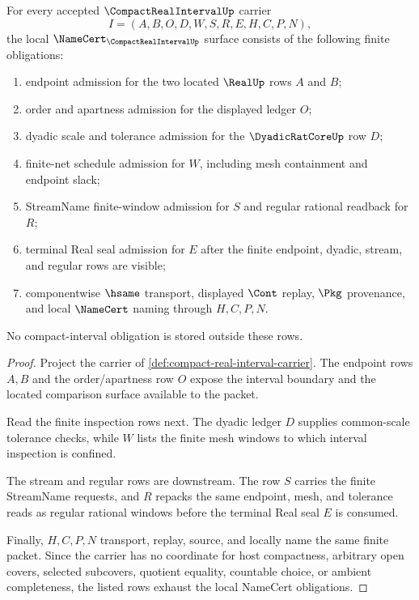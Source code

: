 \begin{theorem}
\label{thm:compact-real-interval-net-obligations}
For every accepted $\CompactRealIntervalUp$ carrier
$$
I=(A,B,O,D,W,S,R,E,H,C,P,N),
$$
the local $\NameCert_{\CompactRealIntervalUp}$ surface consists of the following finite obligations:
\begin{enumerate}
\item endpoint admission for the two located $\RealUp$ rows $A$ and $B$;
\item order and apartness admission for the displayed ledger $O$;
\item dyadic scale and tolerance admission for the $\DyadicRatCoreUp$ row $D$;
\item finite-net schedule admission for $W$, including mesh containment and endpoint slack;
\item StreamName finite-window admission for $S$ and regular rational readback for $R$;
\item terminal Real seal admission for $E$ after the finite endpoint, dyadic, stream, and regular rows are visible;
\item componentwise $\hsame$ transport, displayed $\Cont$ replay, $\Pkg$ provenance, and local $\NameCert$ naming through $H,C,P,N$.
\end{enumerate}
No compact-interval obligation is stored outside these rows.
\end{theorem}
\begin{proof}
Project the carrier of \autoref{def:compact-real-interval-carrier}. The endpoint rows $A,B$ and the order/apartness row $O$ expose the interval boundary and the located comparison surface available to the packet.

Read the finite inspection rows next. The dyadic ledger $D$ supplies common-scale tolerance checks, while $W$ lists the finite mesh windows to which interval inspection is confined.

The stream and regular rows are downstream. The row $S$ carries the finite StreamName requests, and $R$ repacks the same endpoint, mesh, and tolerance reads as regular rational windows before the terminal Real seal $E$ is consumed.

Finally, $H,C,P,N$ transport, replay, source, and locally name the same finite packet. Since the carrier has no coordinate for host compactness, arbitrary open covers, selected subcovers, quotient equality, countable choice, or ambient completeness, the listed rows exhaust the local NameCert obligations.
\end{proof}

